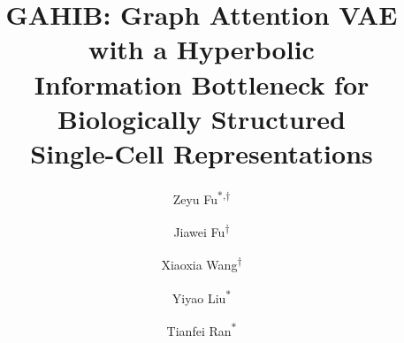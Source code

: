 \documentclass[preprint,12pt]{elsarticle}
\begin{document}
\begin{frontmatter}

\title{GAHIB: Graph Attention VAE with a Hyperbolic\\
Information Bottleneck for Biologically Structured\\
Single-Cell Representations}

\author[amu]{Zeyu Fu\textsuperscript{$\ast$,$\dagger$}}

\author[xinqiao]{Jiawei Fu\textsuperscript{$\dagger$}}

\author[cqmu]{Xiaoxia Wang\textsuperscript{$\dagger$}}

\author[amutox]{Yiyao Liu\textsuperscript{$\ast$}}

\author[xinqiao]{Tianfei Ran\textsuperscript{$\ast$}}

\address[amu]{State Key Laboratory of Trauma and Chemical Poisoning,
Institute of Combined Injury, Chongqing Engineering Research Center for
Nanomedicine, College of Preventive Medicine, Army Medical University,
Chongqing, 400038, China}
\address[xinqiao]{Department of Orthopedics, Xinqiao Hospital,
Army Medical University, Chongqing, 400037, China}
\address[cqmu]{Department of Hepatobiliary Surgery, The Second Affiliated
Hospital of Chongqing Medical University, Chongqing, 400037, China}
\address[amutox]{State Key Laboratory of Trauma and Chemical Poisoning,
Key Laboratory of Medical Protection for Electromagnetic Radiation,
Ministry of Education of China, Institute of Toxicology, College of
Preventive Medicine, Army Medical University, Chongqing, 400038, China}

\address[note]{%
  \textsuperscript{$\ast$}Corresponding authors: Zeyu Fu
  (\href{mailto:fuzeyu99@126.com}{fuzeyu99@126.com};
  ORCID \href{https://orcid.org/0009-0001-8329-0108}{0009-0001-8329-0108}),
  Yiyao Liu
  (\href{mailto:2415084056@qq.com}{2415084056@qq.com}),
  Tianfei Ran
  (\href{mailto:rantianfei@tmmu.edu.cn}{rantianfei@tmmu.edu.cn}).
  \textsuperscript{$\dagger$}Zeyu Fu, Jiawei Fu and Xiaoxia Wang
  contributed equally to this work.}


\end{frontmatter}
\end{document}
